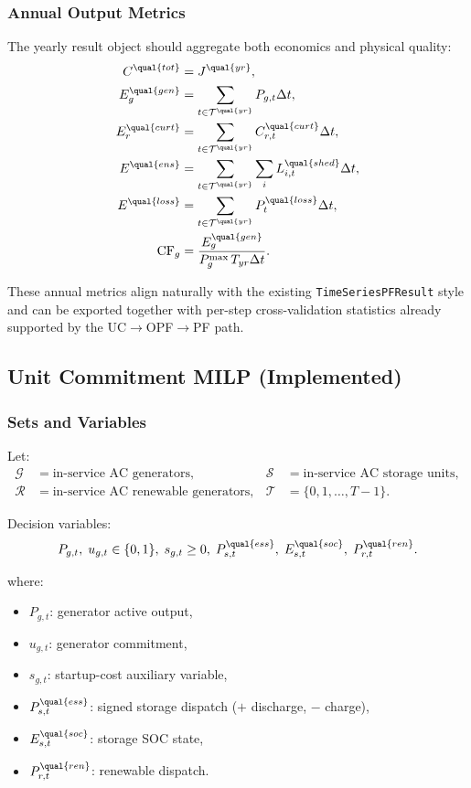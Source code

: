 \subsubsection{Annual Output Metrics}
\label{sec:annual-metrics}

The yearly result object should aggregate both economics and physical quality:
\begin{align}
C^{\qual{tot}} &= J^{\qual{yr}}, \\
E^{\qual{gen}}_g &= \sum_{t\in\mathcal{T}^{\qual{yr}}} P_{g,t}\Delta t, \\
E^{\qual{curt}}_r &= \sum_{t\in\mathcal{T}^{\qual{yr}}} C_{r,t}^{\qual{curt}}\Delta t, \\
E^{\qual{ens}} &= \sum_{t\in\mathcal{T}^{\qual{yr}}}\sum_i L_{i,t}^{\qual{shed}}\Delta t, \\
E^{\qual{loss}} &= \sum_{t\in\mathcal{T}^{\qual{yr}}} P_t^{\qual{loss}}\Delta t, \\
\mathrm{CF}_g &= \frac{E_g^{\qual{gen}}}{P_g^{\max}\,T_{yr}\Delta t}.
\label{eq:annual-metrics}
\end{align}

These annual metrics align naturally with the existing
\texttt{TimeSeriesPFResult} style and can be exported together with per-step
cross-validation statistics already supported by the UC\(\to\)OPF\(\to\)PF path.

\subsection{Unit Commitment MILP (Implemented)}
\label{sec:dopf}

\subsubsection{Sets and Variables}

Let:
\begin{align}
\mathcal{G}&=\text{in-service AC generators}, &
\mathcal{S}&=\text{in-service AC storage units}, \\
\mathcal{R}&=\text{in-service AC renewable generators}, &
\mathcal{T}&=\{0,1,\dots,T-1\}.
\end{align}

Decision variables:
\begin{align}
P_{g,t},\; u_{g,t}\in\{0,1\},\; s_{g,t}\ge 0,\;
P^{\qual{ess}}_{s,t},\; E^{\qual{soc}}_{s,t},\; P^{\qual{ren}}_{r,t}.
\end{align}

where:
\begin{itemize}
\item \(P_{g,t}\): generator active output,
\item \(u_{g,t}\): generator commitment,
\item \(s_{g,t}\): startup-cost auxiliary variable,
\item \(P^{\qual{ess}}_{s,t}\): signed storage dispatch (\(+\) discharge, \(-\) charge),
\item \(E^{\qual{soc}}_{s,t}\): storage SOC state,
\item \(P^{\qual{ren}}_{r,t}\): renewable dispatch.
\end{itemize}

